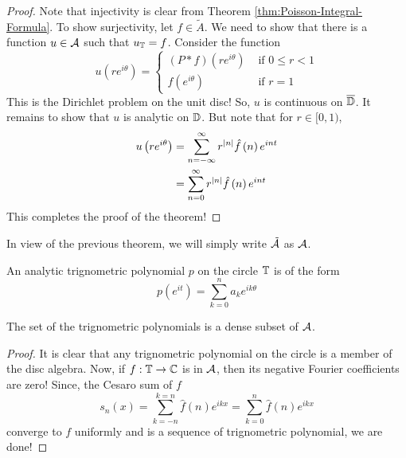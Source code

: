 \begin{proof}
    Note that injectivity is clear from Theorem \ref{thm:Poisson-Integral-Formula}. To show surjectivity, let $f\in \tilde{A}$. We need to show that there is a function $u \in {\cal A}$ such that $u_{\mathbb T} = f$. Consider the function
    \begin{equation*}
	u\left( re^{i\theta} \right) =
	\begin{cases}
	    (P*f) (re^{i\theta}) & \text{ if } 0\le r <1 \\ 
	    f\left( e^{i\theta} \right) & \text{ if } r=1
	\end{cases}
    \end{equation*}
    This is the Dirichlet problem on the unit disc! So, $u$ is continuous on $\overline {\mathbb D}$. It remains to show that $u$ is analytic on $\mathbb D$. But note that for $r\in [0,1)$,
    \begin{align*}
    u\left( re^{i\theta} \right) &= \sum_{n=-\infty}^{\infty} r^{\left\lvert n \right\rvert} \hat{f}\left( n \right) e^{int} \\
&= \sum_{n=0}^{\infty} r^{\left\lvert n \right\rvert} \hat{f}\left( n \right) e^{int} 
    \end{align*}
    This completes the proof of the theorem!
\end{proof}

In view of the previous theorem, we will simply write $\tilde{{\cal A}}$ as ${\cal A}$.

\begin{definition}
    An analytic trignometric polynomial $p$ on the circle $\mathbb T$ is of the form
    \begin{equation*}
	p\left( e^{it} \right) = \sum_{k=0}^{n} a_{k} e^{ik\theta}
    \end{equation*}
    \label{def:trignometric-polynomial}
\end{definition}

\begin{proposition}
    The set of the trignometric polynomials is a dense subset of ${\cal A}$.
    \label{prop:disc-algebra-separable}
\end{proposition}
\begin{proof}
    It is clear that any trignometric polynomial on the circle is a member of the disc algebra. Now, if $f: \mathbb T \to \mathbb C$ is in ${\cal A}$, then its negative Fourier coefficients are zero! Since, the Cesaro sum of $f$ 
    \begin{equation*}
	s_{n} \left( x \right) = \sum_{k=-n}^{k=n} \hat{f} (n) e^{ikx} = \sum_{k=0}^{n} \hat{f} (n) e^{ikx}
    \end{equation*}
    converge to $f$ uniformly and is a sequence of trignometric polynomial, we are done!
\end{proof}

